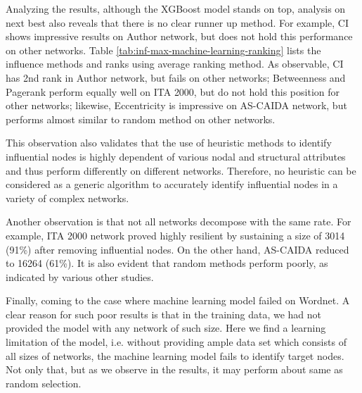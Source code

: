 		Analyzing the results, although the XGBoost model stands on top, analysis on next best also reveals that there is no clear runner up method. For example, CI shows impressive results on Author network, but does not hold this performance on other networks. Table \ref{tab:inf-max-machine-learning-ranking} lists the influence methods and ranks using average ranking method. As observable, CI has 2nd rank in Author network, but fails on other networks; Betweenness and Pagerank perform equally well on ITA 2000, but do not hold this position for other networks; likewise, Eccentricity is impressive on AS-CAIDA network, but performs almost similar to random method on other networks.
		
		This observation also validates that the use of heuristic methods to identify influential nodes is highly dependent of various nodal and structural attributes and thus perform differently on different networks. Therefore, no heuristic can be considered as a generic algorithm to accurately identify influential nodes in a variety of complex networks.
		
		Another observation is that not all networks decompose with the same rate. For example, ITA 2000 network proved highly resilient by sustaining a size of 3014 (91\%) after removing influential nodes. On the other hand, AS-CAIDA reduced to 16264 (61\%). It is also evident that random methods perform poorly, as indicated by various other studies.
		
		Finally, coming to the case where machine learning model failed on Wordnet. A clear reason for such poor results is that in the training data, we had not provided the model with any network of such size. Here we find a learning limitation of the model, i.e. without providing ample data set which consists of all sizes of networks, the machine learning model fails to identify target nodes. Not only that, but as we observe in the results, it may perform about same as random selection.
		
